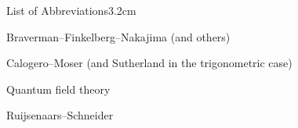 

\begin{mclistof}{List of Abbreviations}{3.2cm}
 \item[BFN] Braverman--Finkelberg--Nakajima (and others)
 \item[CM] Calogero--Moser (and Sutherland in the trigonometric case)
 \item[QFT] Quantum field theory
 \item[RS] Ruijsenaars--Schneider
\end{mclistof}
